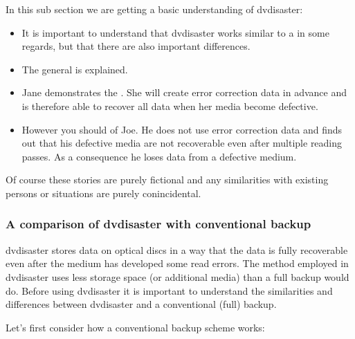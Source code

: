 In this sub section we are getting a basic understanding
of dvdisaster:

\begin{itemize}
\item It is important to understand that dvdisaster works similar
  to a  in some
  regards, but that there are also important differences.
\item The general
   is explained.
\item Jane demonstrates the
  .
  She will create error correction data in advance and is
  therefore able to recover all data when her media become defective.
\item However you should 
  of Joe. He does not use error correction data and finds out that
  his defective media are not recoverable even after multiple
  reading passes. As a consequence he loses data from a defective medium.
\end{itemize}

Of course these stories are purely fictional and any similarities with existing persons or situations are purely conincidental. 

\subsubsection{A comparison of dvdisaster with conventional backup}
\label{bigpicture-backup}

dvdisaster stores data on optical discs in a way that the data
is fully recoverable even after the medium has developed some read errors.
The method employed in dvdisaster uses less storage space (or additional media)
than a full backup would do. Before using dvdisaster it is important to
understand the similarities and differences between dvdisaster and a
conventional (full) backup.

\bigskip

Let's first consider how a conventional backup scheme works:

\bigskip

